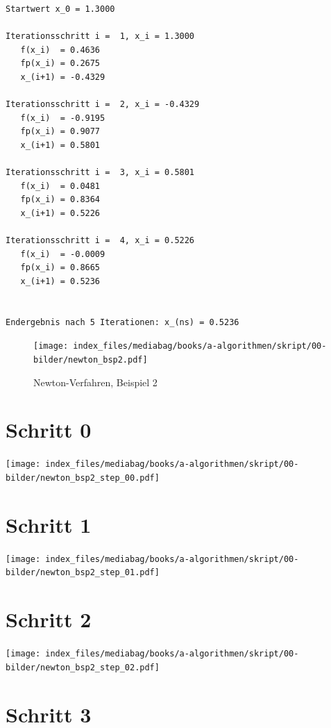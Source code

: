 \documentclass[
  letterpaper,
  DIV=11,
  numbers=noendperiod]{scrreprt}
\begin{document}
\begin{verbatim}
Startwert x_0 = 1.3000

Iterationsschritt i =  1, x_i = 1.3000
   f(x_i)  = 0.4636
   fp(x_i) = 0.2675
   x_(i+1) = -0.4329

Iterationsschritt i =  2, x_i = -0.4329
   f(x_i)  = -0.9195
   fp(x_i) = 0.9077
   x_(i+1) = 0.5801

Iterationsschritt i =  3, x_i = 0.5801
   f(x_i)  = 0.0481
   fp(x_i) = 0.8364
   x_(i+1) = 0.5226

Iterationsschritt i =  4, x_i = 0.5226
   f(x_i)  = -0.0009
   fp(x_i) = 0.8665
   x_(i+1) = 0.5236


Endergebnis nach 5 Iterationen: x_(ns) = 0.5236
\end{verbatim}

\begin{figure}[H]

{\centering \texttt{[image: index\_files/mediabag/books/a-algorithmen/skript/00-bilder/newton\_bsp2.pdf]}

}

\caption{Newton-Verfahren, Beispiel 2}

\end{figure}%

\section{Schritt 0}

\texttt{[image: index\_files/mediabag/books/a-algorithmen/skript/00-bilder/newton\_bsp2\_step\_00.pdf]}

\section{Schritt 1}

\texttt{[image: index\_files/mediabag/books/a-algorithmen/skript/00-bilder/newton\_bsp2\_step\_01.pdf]}

\section{Schritt 2}

\texttt{[image: index\_files/mediabag/books/a-algorithmen/skript/00-bilder/newton\_bsp2\_step\_02.pdf]}

\section{Schritt 3}
\end{document}
